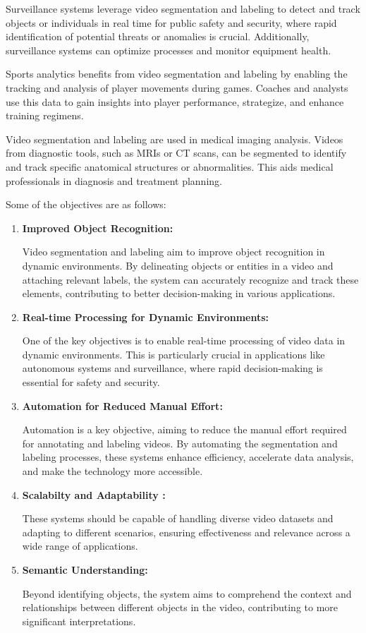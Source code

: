 \noindent
Surveillance systems leverage video segmentation and labeling to detect and track objects or individuals in real time for public safety and security, where rapid identification of potential threats or anomalies is crucial. Additionally, surveillance systems can optimize processes and monitor equipment health.

\noindent
Sports analytics benefits from video segmentation and labeling by enabling the tracking and analysis of player movements during games. Coaches and analysts use this data to gain insights into player performance, strategize, and enhance training regimens.

\noindent
 Video segmentation and labeling are used in medical imaging analysis. Videos from diagnostic tools, such as MRIs or CT scans, can be segmented to identify and track specific anatomical structures or abnormalities. This aids medical professionals in diagnosis and treatment planning.

\clearpage

\noindent
Some of the objectives are as follows:

\begin{enumerate}
 

\item \textbf{ Improved Object Recognition:}

Video segmentation and labeling aim to improve object recognition in dynamic environments. By delineating objects or entities in a video and attaching relevant labels, the system can accurately recognize and track these elements, contributing to better decision-making in various applications.

\item \textbf{ Real-time Processing for Dynamic Environments:}

One of the key objectives is to enable real-time processing of video data in dynamic environments. This is particularly crucial in applications like autonomous systems and surveillance, where rapid decision-making is essential for safety and security.


\item\textbf{Automation for Reduced Manual Effort:}

Automation is a key objective, aiming to reduce the manual effort required for annotating and labeling videos. By automating the segmentation and labeling processes, these systems enhance efficiency, accelerate data analysis, and make the technology more accessible.

\item \textbf{Scalabilty and Adaptability :}

These systems should be capable of handling diverse video datasets and adapting to different scenarios, ensuring effectiveness and relevance across a wide range of applications.

\item \textbf{Semantic Understanding:}

Beyond identifying objects, the system aims to comprehend the context and relationships between different objects in the video, contributing to more significant interpretations.

\end{enumerate}


\renewcommand{\footrulewidth}{0.4pt}